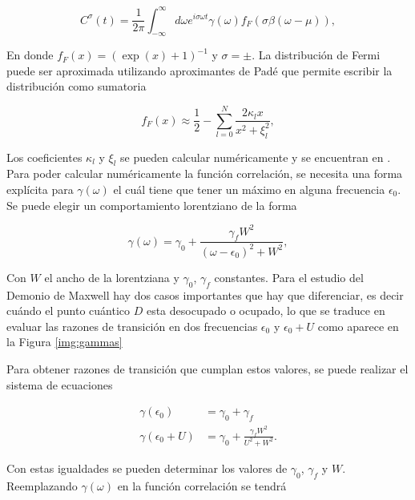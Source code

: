 \begin{appendixs}
\begin{equation*}
    C^{\sigma}(t) = \frac{1}{2\pi} \int_{-\infty}^{\infty} d\omega e^{i\sigma \omega t} \gamma(\omega) f_{F}(\sigma \beta(\omega-\mu)),
\end{equation*}

En donde $f_{F}(x) = (\exp(x)+1)^{-1}$ y $\sigma = \pm$. La distribución de Fermi puede ser aproximada utilizando aproximantes de Padé \cite{hu2011pade,schinabeck2019hierarchical} que permite escribir la distribución como sumatoria

\begin{equation}
    f_{F}(x) \approx \frac{1}{2} - \sum_{l=0}^{N} \frac{ 2 \kappa_{l}x }{ x^{2} + \xi^{2}_{l} },
    \label{apendix5:pade}
\end{equation}

Los coeficientes $\kappa_{l}$ y $\xi_{l}$ se pueden calcular numéricamente y se encuentran en \cite{hu2011pade}. Para poder calcular numéricamente la función correlación, se necesita una forma explícita para $\gamma(\omega)$ el cuál tiene que tener un máximo en alguna frecuencia $\epsilon_{0}$. Se puede elegir un comportamiento lorentziano de la forma

\begin{equation*}
    \gamma(\omega) = \gamma_{0} + \frac{\gamma_{f} W^{2}}{(\omega - \epsilon_{0})^{2} + W^{2}},
\end{equation*}

Con $W$ el ancho de la lorentziana y $\gamma_{0}$, $\gamma_{f}$ constantes. Para el estudio del Demonio de Maxwell hay dos casos importantes que hay que diferenciar, es decir cuándo el punto cuántico $D$ esta desocupado o ocupado, lo que se traduce en evaluar las razones de transición en dos frecuencias $\epsilon_{0}$ y $\epsilon_{0}+U$ como aparece en la Figura \ref{img:gammas}


Para obtener razones de transición que cumplan estos valores, se puede realizar el sistema de ecuaciones 

\begin{align*}
    \gamma(\epsilon_{0}) & = \gamma_{0} + \gamma_{f} \\
    \gamma(\epsilon_{0} + U) & = \gamma_{0} + \frac{\gamma_{f} W^{2} }{U^{2} + W^{2}}.
\end{align*}

Con estas igualdades se pueden determinar los valores de $\gamma_{0}$, $\gamma_{f}$ y $W$. Reemplazando $\gamma(\omega)$ en la función correlación se tendrá


\end{appendixs}
